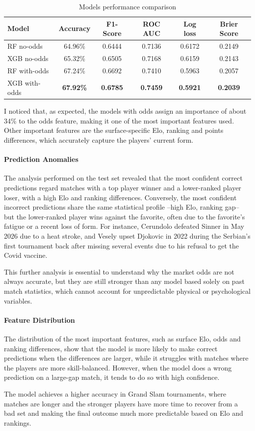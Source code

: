 \begin{table}[ht]
    \centering
    \caption{Models performance comparison}
    \label{tab:models_results}
    \begin{tabular}{lccccc}
        \hline
        Model & Accuracy & F1-Score & ROC AUC & Log loss & Brier Score \\
        \hline
        RF no-odds & 64.96\% & 0.6444 & 0.7136 & 0.6172 & 0.2149 \\
        XGB no-odds & 65.32\% & 0.6505 & 0.7168 & 0.6159 & 0.2143 \\
        RF with-odds & 67.24\% & 0.6692 & 0.7410 & 0.5963 & 0.2057 \\
        XGB with-odds & \textbf{67.92\%} & \textbf{0.6785} & \textbf{0.7459} & \textbf{0.5921} & \textbf{0.2039} \\
        \hline
    \end{tabular}
\end{table}

I noticed that, as expected, the models with odds assign an importance of about 34\% to the odds feature, making it one of the most important features used. 
Other important features are the surface-specific Elo, ranking and points differences, which accurately capture the players' current form.

\paragraph{Prediction Anomalies} The analysis performed on the test set revealed that the most confident correct predictions regard matches with a top player winner and a lower-ranked player loser, with a high Elo and ranking differences.
Conversely, the most confident incorrect predictions share the same statistical profile --high Elo, ranking gap-- but the lower-ranked player wins against the favorite, often due to the favorite's fatigue or a recent loss of form.
For instance, Cerundolo defeated Sinner in May 2026 due to a heat stroke, and Vesely upset Djokovic in 2022 during the Serbian's first tournament back after missing several events due to his refusal to get the Covid vaccine.

This further analysis is essential to understand why the market odds are not always accurate, but they are still stronger than any model based solely on past match statistics, which cannot account for unpredictable physical or psychological variables.

\paragraph{Feature Distribution} The distribution of the most important features, such as surface Elo, odds and ranking differences, show that the model is more likely to make correct predictions when the differences are larger, while it struggles with matches where the players are more skill-balanced.
However, when the model does a wrong prediction on a large-gap match, it tends to do so with high confidence.

The model achieves a higher accuracy in Grand Slam tournaments, where matches are longer and the stronger players have more time to recover from a bad set and making the final outcome much more predictable based on Elo and rankings.


